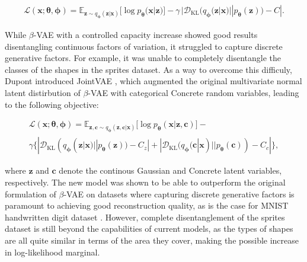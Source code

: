 \documentclass{report}
\begin{document}
\begin{equation}
\begin{gathered}
\mathcal{L}(\boldsymbol{x}; \boldsymbol{\theta}, \boldsymbol{\phi}) =
\mathbb{E}_{\boldsymbol{z} \sim q_{\boldsymbol{\phi}}(\boldsymbol{z}|\boldsymbol{x})} \big[ \log p_{\boldsymbol{\theta}} (\boldsymbol{x} | \boldsymbol{z}) \big] - \gamma \, | \mathcal{D}_\text{KL}(q_{\boldsymbol{\phi}}(\boldsymbol{z}|\boldsymbol{x}) || p_{\boldsymbol{\theta}}(\boldsymbol{z})) - C |.
\end{gathered}
\label{eq:cc-vae}
\end{equation} 

\bigskip

\noindent While $\beta$-VAE with a controlled capacity increase showed good results disentangling continuous factors of variation, it struggled to capture discrete generative factors. For example, it was unable to completely disentangle the classes of the shapes in the sprites dataset. As a way to overcome this difficuly, Dupont introduced JointVAE \cite{joint-vae}, which augmented the original multivariate normal latent distirbution of $\beta$-VAE with categorical Concrete random variables, leading to the following objective:

\begin{equation}
\begin{gathered}
\mathcal{L}(\boldsymbol{x}; \boldsymbol{\theta}, \boldsymbol{\phi}) =
\mathbb{E}_{\boldsymbol{z, c} \sim q_{\boldsymbol{\phi}}(\boldsymbol{z, c}|\boldsymbol{x})} \big[ \log p_{\boldsymbol{\theta}} (\boldsymbol{x} | \boldsymbol{z, c}) \big] - \\ \gamma \big\{ | \mathcal{D}_\text{KL}(q_{\boldsymbol{\phi}}(\boldsymbol{z}|\boldsymbol{x}) || p_{\boldsymbol{\theta}}(\boldsymbol{z})) - C_z | + | \mathcal{D}_\text{KL}(q_{\boldsymbol{\phi}}(\boldsymbol{c}|\boldsymbol{x}) || p_{\boldsymbol{\theta}}(\boldsymbol{c})) - C_c | \big\},
\end{gathered}
\end{equation}

\bigskip

\noindent where $\boldsymbol{z}$ and $\boldsymbol{c}$ denote the continous Gaussian and Concrete latent variables, respectively. The new model was shown to be able to outperform the original formulation of $\beta$-VAE on datasets where capturing discrete generative factors is paramount to achieving good reconstruction quality, as is the case for MNIST handwritten digit dataset \cite{mnist}. However, complete disentanglement of the sprites dataset is still beyond the capabilities of current models, as the types of shapes are all quite similar in terms of the area they cover, making the possible increase in log-likelihood marginal.
\end{document}
